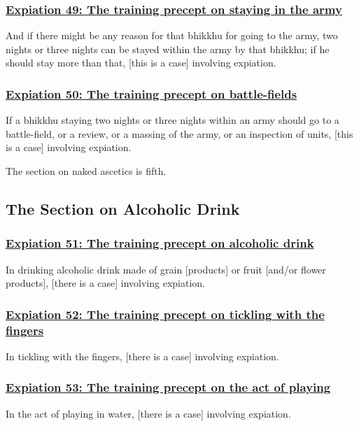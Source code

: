 \subsubsection*{\hyperref[pac49]{Expiation 49: The training precept on staying in the army}}
\label{exp49}
And if there might be any reason for that bhikkhu for going to the army, two nights or three nights can be stayed within the army by that bhikkhu; if he should stay more than that, [this is a case] involving expiation.

\subsubsection*{\hyperref[pac50]{Expiation 50: The training precept on battle-fields}}
\label{exp50}
If a bhikkhu staying two nights or three nights within an army should go to a battle-field, or a review, or a massing of the army, or an inspection of units, [this is a case] involving expiation. 

The section on naked ascetics is fifth.

\setsubsecheadstyle{\subsectionFmt}
\subsection{The Section on Alcoholic Drink}
\vspace{0.2cm}

\subsubsection*{\hyperref[pac51]{Expiation 51: The training precept on alcoholic drink}}
\label{exp51}
In drinking alcoholic drink made of grain [products] or fruit [and/or flower products], [there is a case] involving expiation.

\subsubsection*{\hyperref[pac52]{Expiation 52: The training precept on tickling with the fingers}}
\label{exp52}
In tickling with the fingers, [there is a case] involving expiation.

\subsubsection*{\hyperref[pac53]{Expiation 53: The training precept on the act of playing}}
\label{exp53}
In the act of playing in water, [there is a case] involving expiation.


